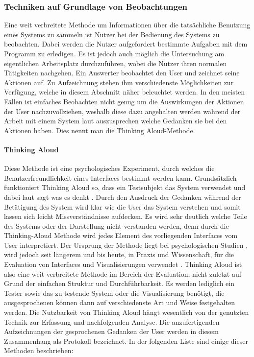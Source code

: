 \documentclass[draft=false
              ,paper=a4
              ,twoside=false
              ,fontsize=11pt
              ,headsepline
              ,BCOR10mm
              ,DIV11
              ]{scrbook}
\begin{document}
\subsubsection{Techniken auf Grundlage von Beobachtungen} %
\label{ssub:techniken_auf_grundlage_von_beobachtungen}
Eine weit verbreitete Methode um Informationen über die tatsächliche Benutzung eines Systems zu sammeln ist Nutzer bei der Bedienung des Systems zu beobachten. Dabei werden die Nutzer aufgefordert bestimmte Aufgaben mit dem Programm zu erledigen. Es ist jedoch auch möglich die Untersuchung am eigentlichen Arbeitsplatz durchzuführen, wobei die Nutzer ihren normalen Tätigkeiten nachgehen. Ein Auswerter beobachtet den User und zeichnet seine Aktionen auf. Zu Aufzeichnung stehen ihm verschiedenste Möglichkeiten zur Verfügung, welche in diesem Abschnitt näher beleuchtet werden. In den meisten Fällen ist einfaches Beobachten nicht genug um die Auswirkungen der Aktionen der User nachzuvollziehen, weshalb diese dazu angehalten werden während der Arbeit mit einem System laut auszusprechen welche Gedanken sie bei den Aktionen haben. Dies nennt man die \"Thinking Aloud\"-Methode. 

\paragraph{Thinking Aloud} %
\label{par:thinking_aloud}
Diese Methode ist eine psychologisches Experiment, durch welches die Benutzerfreundlichkeit eines Interfaces bestimmt werden kann. Grundsätzlich funktioniert Thinking Aloud so, dass ein Testsubjekt das System verwendet und dabei laut sagt was es denkt \cite{lewis_using_1982}. Durch den Ausdruck der Gedanken während der Betätigung des System wird klar wie die User das System verstehen und somit lassen sich leicht Missverständnisse aufdecken. Es wird sehr deutlich welche Teile des Systems oder der Darstellung nicht verstanden werden, denn durch die Thinking-Aloud Methode wird jedes Element des vorliegenden Interfaces vom User interpretiert.
Der Ursprung der Methode liegt bei psychologischen Studien \cite{ericsson_verbal_1980}, wird jedoch seit längerem und bis heute, in Praxis und Wissenschaft, für die Evaluation von Interfaces und Visualisierungen verwendet \cite{blascheck_triangulating_2016}\cite{denning_value_1990}. Thinking Aloud ist also eine weit verbreitete Methode im Bereich der Evaluation, nicht zuletzt auf Grund der einfachen Struktur und Durchführbarkeit. Es werden lediglich ein Tester sowie das zu testende System oder die Visualisierung benötigt, die ausgesprochenen können dann auf verschiedenste Art und Weise festgehalten werden. Die Nutzbarkeit von Thinking Aloud hängt wesentlich von der genutzten Technik zur Erfassung und nachfolgenden Analyse. Die anzufertigenden Aufzeichnungen der gesprochenen Gedanken der User werden in diesem Zusammenhang als Protokoll bezeichnet. In der folgenden Liste sind einige dieser Methoden beschrieben:
\end{document}

